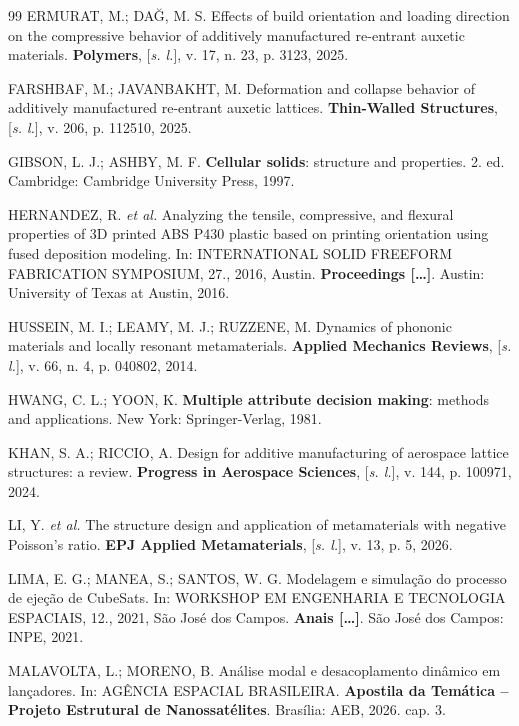 \begin{thebibliography}{99}
ERMURAT, M.; DA\u{G}, M. S. Effects of build orientation and loading direction on the compressive behavior of additively manufactured re-entrant auxetic materials. \textbf{Polymers}, [\textit{s. l.}], v. 17, n. 23, p. 3123, 2025.

FARSHBAF, M.; JAVANBAKHT, M. Deformation and collapse behavior of additively manufactured re-entrant auxetic lattices. \textbf{Thin-Walled Structures}, [\textit{s. l.}], v. 206, p. 112510, 2025.

GIBSON, L. J.; ASHBY, M. F. \textbf{Cellular solids}: structure and properties. 2. ed. Cambridge: Cambridge University Press, 1997.

HERNANDEZ, R. \textit{et al.} Analyzing the tensile, compressive, and flexural properties of 3D printed ABS P430 plastic based on printing orientation using fused deposition modeling. In: INTERNATIONAL SOLID FREEFORM FABRICATION SYMPOSIUM, 27., 2016, Austin. \textbf{Proceedings [\ldots]}. Austin: University of Texas at Austin, 2016.

HUSSEIN, M. I.; LEAMY, M. J.; RUZZENE, M. Dynamics of phononic materials and locally resonant metamaterials. \textbf{Applied Mechanics Reviews}, [\textit{s. l.}], v. 66, n. 4, p. 040802, 2014.

HWANG, C. L.; YOON, K. \textbf{Multiple attribute decision making}: methods and applications. New York: Springer-Verlag, 1981.

KHAN, S. A.; RICCIO, A. Design for additive manufacturing of aerospace lattice structures: a review. \textbf{Progress in Aerospace Sciences}, [\textit{s. l.}], v. 144, p. 100971, 2024.

LI, Y. \textit{et al.} The structure design and application of metamaterials with negative Poisson's ratio. \textbf{EPJ Applied Metamaterials}, [\textit{s. l.}], v. 13, p. 5, 2026.

LIMA, E. G.; MANEA, S.; SANTOS, W. G. Modelagem e simulação do processo de ejeção de CubeSats. In: WORKSHOP EM ENGENHARIA E TECNOLOGIA ESPACIAIS, 12., 2021, São José dos Campos. \textbf{Anais [\ldots]}. São José dos Campos: INPE, 2021.

MALAVOLTA, L.; MORENO, B. Análise modal e desacoplamento dinâmico em lançadores. In: AGÊNCIA ESPACIAL BRASILEIRA. \textbf{Apostila da Temática -- Projeto Estrutural de Nanossatélites}. Brasília: AEB, 2026. cap. 3.


\end{thebibliography}
